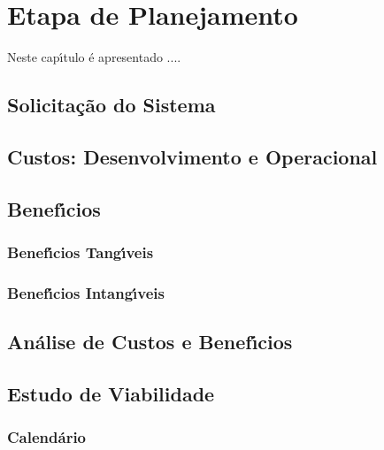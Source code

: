 
\chapter{Etapa de Planejamento}


Neste cap\'{\i}tulo \'{e} apresentado ....


\section{Solicita\c{c}\~{a}o do Sistema}


\section{Custos: Desenvolvimento e Operacional} 


\section{Benef\'{\i}cios}


       \subsection{Benef\'{\i}cios Tang\'{\i}veis}


       \subsection{Benef\'{\i}cios Intang\'{\i}veis}


\section{An\'{a}lise de Custos e Benef\'{\i}cios}





\section{Estudo de Viabilidade}


       \subsection{Calend\'{a}rio }

